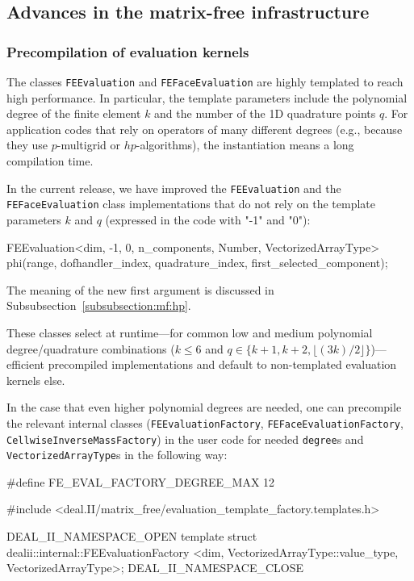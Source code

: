 \documentclass{ansarticle-preprint}
\begin{document}
\subsection{Advances in the matrix-free infrastructure}
\label{subsec:mf}

\subsubsection{Precompilation of evaluation kernels}

The classes \texttt{FEEvaluation} and \texttt{FEFaceEvaluation} are highly
templated to reach high performance. In particular, the template parameters include
the polynomial degree of the finite element $k$ and the number of the 1D quadrature points $q$.
For application codes that rely on operators of many different degrees (e.g., because
they use $p$-multigrid or $hp$-algorithms), the instantiation
means a long compilation time. 

In the current release, we have improved the \texttt{FEEvaluation} and the \texttt{FEFaceEvaluation} class implementations that do
not rely on the template parameters $k$ and $q$ (expressed in the code
with "-1" and "0"):
\begin{c++}
FEEvaluation<dim, -1, 0, n_components, Number, VectorizedArrayType>
  phi(range, dofhandler_index, quadrature_index, first_selected_component);
\end{c++}
The meaning of the new first argument is 
discussed in Subsubsection~\ref{subsubsection:mf:hp}.

These classes select at runtime---for common low and medium polynomial degree/quadrature combinations ($k\le 6$ and $q\in\{ k+1, k+2, \lfloor (3k)/2 \rfloor \}$)---efficient precompiled implementations and default to non-templated 
evaluation kernels else. 

In the case that even higher polynomial degrees are needed, one can precompile the
relevant internal classes
(\texttt{FEEvaluationFactory}, \texttt{FEFaceEvaluationFactory}, \texttt{CellwiseInverseMassFactory}) in the user code for needed \texttt{degree}s
and \texttt{VectorizedArrayType}s in the following way:
\begin{c++}
#define FE_EVAL_FACTORY_DEGREE_MAX 12

#include <deal.II/matrix_free/evaluation_template_factory.templates.h>

DEAL_II_NAMESPACE_OPEN
template struct dealii::internal::FEEvaluationFactory
  <dim, VectorizedArrayType::value_type, VectorizedArrayType>;  
DEAL_II_NAMESPACE_CLOSE
\end{c++}
\end{document}
